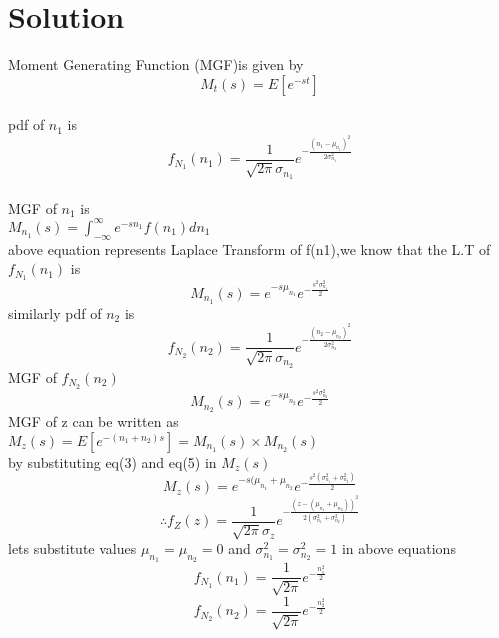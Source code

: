 \documentclass[journal,12pt,twocolumn]{IEEEtran}
\begin{document}
\section{Solution}
Moment Generating Function (MGF)is given by 
\begin{equation}
   M_t(s)=E[e^{-st}] 
\end{equation}\\
pdf of $n_1$ is 
\begin{equation}
    f_{N_1}(n_1)=\frac{1}{\sqrt{2\pi}\sigma_{n_1}}e^{-\frac{(n_1-\mu_{n_1})^2}{2\sigma_{n_1}^2}}
\end{equation} \\
MGF of $n_1$ is \\
$M_{n_1}(s)=\int_{-\infty}^{\infty}e^{-s n_1}f({n_1}) d{n_1} $ \\
above equation represents Laplace Transform of f(n1),we know that the L.T of $f_{N_1}(n_1)$ is
\begin{equation}
      M_{n_1}(s)=e^{-s\mu_{n_1}}e^{-\frac{s^2\sigma_{n_1}^2}{2}}
\end{equation}
similarly pdf of $n_2$ is
\begin{equation}
    f_{N_2}(n_2)=\frac{1}{\sqrt{2\pi}\sigma_{n_2}}e^{-\frac{(n_2-\mu_{n_2})^2}{2\sigma_{n_2}^2}}
\end{equation}
MGF of $f_{N_2}(n_2)$
\begin{equation}
    M_{n_2}(s)=e^{-s\mu_{n_2}}e^{-\frac{s^2\sigma_{n_2}^2}{2}}
\end{equation}
MGF of z can be written as \\
$M_z(s)=E[e^{-(n_1+n_2)s}]=M_{n_1}(s)\times M_{n_2}(s)$\\
by substituting eq(3) and eq(5) in $M_z(s)$\\
\begin{equation}
    M_z(s)=e^{-s(\mu_{n_1}+\mu_{n_2}}e^{-\frac{s^2(\sigma_{n_1}^2+\sigma_{n_2}^2)}{2}}
\end{equation} 
\begin{equation}
   \therefore f_Z(z)=\frac{1}{\sqrt{2\pi}\sigma_z}e^{-\frac{(z-(\mu_{n_1}+\mu_{n_2}))^2}{2(\sigma_{n_1}^2+\sigma_{n_2}^2)}}
\end{equation}
lets substitute values $\mu_{n_1}=\mu_{n_2}=0$ and $\sigma_{n_1}^2=\sigma_{n_2}^2=1$ in above equations
\begin{equation}
    f_{N_1}(n_1)=\frac{1}{\sqrt{2\pi}}e^{-\frac{n_1^2}{2}}
\end{equation}
\begin{equation}
    f_{N_2}(n_2)=\frac{1}{\sqrt{2\pi}}e^{-\frac{n_2^2}{2}}
\end{equation}
\end{document}

